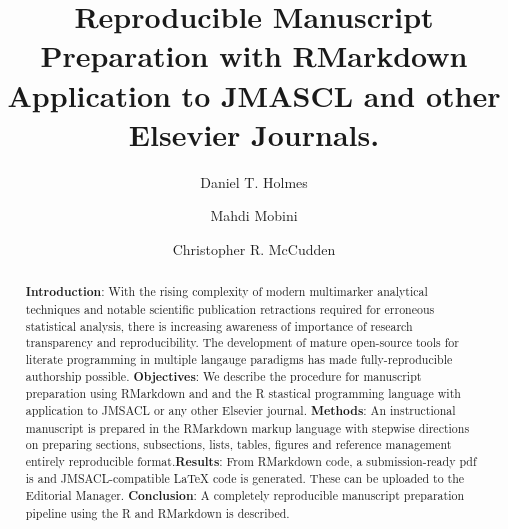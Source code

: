 \documentclass[]{elsarticle} %
\begin{document}
\begin{frontmatter}

  \title{Reproducible Manuscript Preparation with RMarkdown
\newline \large Application to JMASCL and other Elsevier Journals.}
    \author[SPH,UBC]{Daniel T. Holmes}
    \author[SPH,PHCDP]{Mahdi Mobini}
    \author[UO,TOH,EORLA]{Christopher R. McCudden}
      \address[SPH]{St.~Paul's Hospital Department of Pathology and
Laboratory Medicine, 1081 Burrard St., Vancouver, BC V6Z 1Y6 Canada}
    \address[PHCDP]{Providence Health Digital Products, 1190 Hornby St.,
Vancouver, BC V6Z 2K5 Canada}
    \address[UBC]{University of British Columbia Department of Pathology
and Laboratory Medicine, 2211 Wesbrook Mall, Vancouver, BC V6T 1Z7
Canada}
    \address[TOH]{Department of Pathology and Laboratory Medicine,
Ottawa Hospital, General Campus, 501 Smyth Road, Ottawa, ON K1H 8L6
Canada}
    \address[UO]{Department of Pathology and Laboratory Medicine,
University of Ottawa}
    \address[EORLA]{Eastern Ontario Regional Laboratory Association}
  
  \begin{abstract}
  \textbf{Introduction}: With the rising complexity of modern
  multimarker analytical techniques and notable scientific publication
  retractions required for erroneous statistical analysis, there is
  increasing awareness of importance of research transparency and
  reproducibility. The development of mature open-source tools for
  literate programming in multiple langauge paradigms has made
  fully-reproducible authorship possible. \newline \textbf{Objectives}:
  We describe the procedure for manuscript preparation using RMarkdown
  and and the R stastical programming language with application to
  JMSACL or any other Elsevier journal. \newline \textbf{Methods}: An
  instructional manuscript is prepared in the RMarkdown markup language
  with stepwise directions on preparing sections, subsections, lists,
  tables, figures and reference management entirely reproducible
  format.\newline \textbf{Results}: From RMarkdown code, a
  submission-ready pdf is and JMSACL-compatible LaTeX code is generated.
  These can be uploaded to the Editorial Manager.\newline
  \textbf{Conclusion}: A completely reproducible manuscript preparation
  pipeline using the R and RMarkdown is described.\newline
  \end{abstract}
  
 \end{frontmatter}
\end{document}
